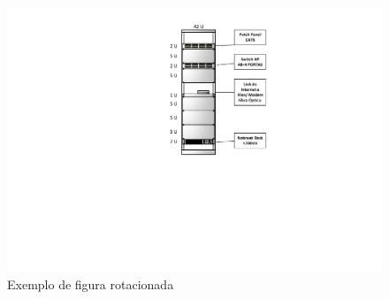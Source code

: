 \documentclass[	DIV=calc,%
							paper=a4,%
							fontsize=12pt,%
							onecolumn]{scrartcl}	 					%
\begin{document}
\begin{figure}
	\centering
	\includegraphics[height=\textwidth,angle=-90]{fig3}
	\caption{Exemplo de figura rotacionada}
	\label{fig3}
\end{figure}


\end{document}
